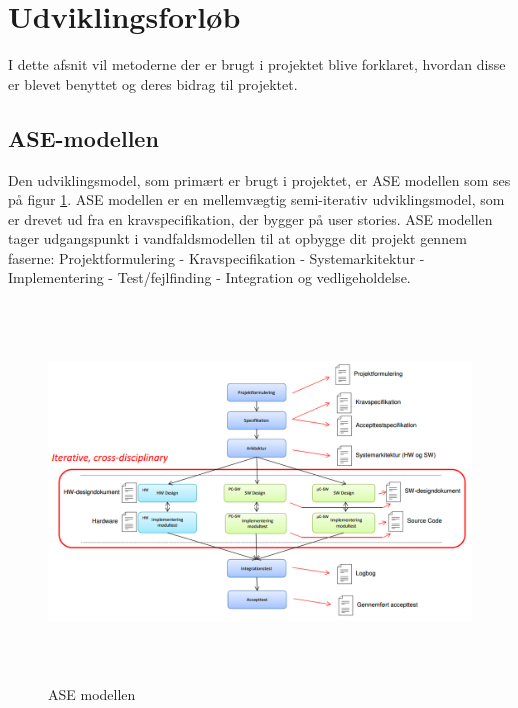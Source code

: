 \section{Udviklingsforløb}
I dette afsnit vil metoderne der er brugt i projektet blive forklaret, hvordan disse er blevet benyttet og deres bidrag til projektet.

\subsection{ASE-modellen}
Den udviklingsmodel, som primært er brugt i projektet, er ASE modellen som ses på figur \ref{fig:ASE}. ASE modellen \cite{ASE} er en mellemvægtig semi-iterativ udviklingsmodel, som er drevet ud fra en kravspecifikation, der bygger på user stories. ASE modellen tager udgangspunkt i vandfaldsmodellen til at opbygge dit projekt gennem faserne: Projektformulering - Kravspecifikation - Systemarkitektur -  Implementering -  Test/fejlfinding -  Integration og vedligeholdelse.

\begin{figure} [H]
	\begin{center}
		\includegraphics[height=10cm, width=12cm]{Udviklingsforlob/ASEModellen}
	\end{center}
	\caption{ASE modellen}
	\label{fig:ASE}
\end{figure}

